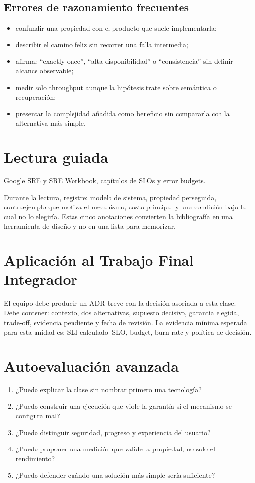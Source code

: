 \documentclass[variant=apuntes,cover=institutional,mode=screen]{ua-engineering-v6-article}
\begin{document}
\subsection{Errores de razonamiento frecuentes}
\begin{itemize}
\item confundir una propiedad con el producto que suele implementarla;
\item describir el camino feliz sin recorrer una falla intermedia;
\item afirmar ``exactly-once'', ``alta disponibilidad'' o ``consistencia'' sin definir alcance observable;
\item medir solo throughput aunque la hipótesis trate sobre semántica o recuperación;
\item presentar la complejidad añadida como beneficio sin compararla con la alternativa más simple.
\end{itemize}

\section{Lectura guiada}
Google SRE y SRE Workbook, capítulos de SLOs y error budgets.

Durante la lectura, registre: modelo de sistema, propiedad perseguida, contraejemplo que motiva el mecanismo, costo principal y una condición bajo la cual no lo elegiría. Estas cinco anotaciones convierten la bibliografía en una herramienta de diseño y no en una lista para memorizar.

\section{Aplicación al Trabajo Final Integrador}
El equipo debe producir un ADR breve con la decisión asociada a esta clase. Debe contener: contexto, dos alternativas, supuesto decisivo, garantía elegida, trade-off, evidencia pendiente y fecha de revisión. La evidencia mínima esperada para esta unidad es: SLI calculado, SLO, budget, burn rate y política de decisión.

\section{Autoevaluación avanzada}
\begin{enumerate}
\item ¿Puedo explicar la clase sin nombrar primero una tecnología?
\item ¿Puedo construir una ejecución que viole la garantía si el mecanismo se configura mal?
\item ¿Puedo distinguir seguridad, progreso y experiencia del usuario?
\item ¿Puedo proponer una medición que valide la propiedad, no solo el rendimiento?
\item ¿Puedo defender cuándo una solución más simple sería suficiente?
\end{enumerate}
\end{document}
